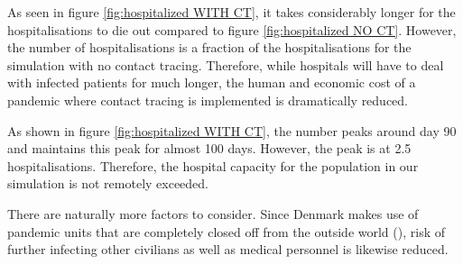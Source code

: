 As seen in figure \vref{fig:hospitalized WITH CT}, it takes considerably longer for the hospitalisations to die out compared to figure \vref{fig:hospitalized NO CT}. However, the number of hospitalisations is a fraction of the hospitalisations for the simulation with no contact tracing. Therefore, while hospitals will have to deal with infected patients for much longer, the human and economic cost of a pandemic where contact tracing is implemented is dramatically reduced.

As shown in figure \vref{fig:hospitalized WITH CT}, the number peaks around day 90 and maintains this peak for almost 100 days. However, the peak is at 2.5 hospitalisations. Therefore, the hospital capacity for the population in our simulation is not remotely exceeded.

There are naturally more factors to consider. Since Denmark makes use of pandemic units that are completely closed off from the outside world (\cite{dansk_sygeplejerad_fra_2020}), risk of further infecting other civilians as well as medical personnel is likewise reduced.